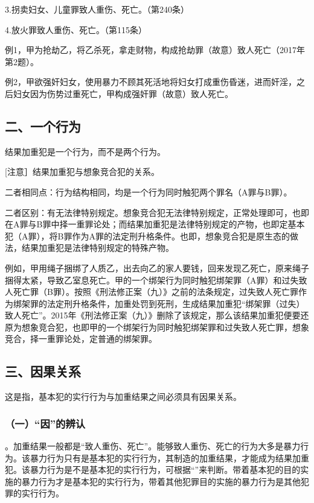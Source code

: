 3.拐卖妇女、儿童罪致人重伤、死亡。（第240条）

4.放火罪致人重伤、死亡。（第115条）

例1，甲为抢劫乙，将乙杀死，拿走财物，构成抢劫罪（故意）致人死亡（2017年第2题）。

例2，甲欲强奸妇女，使用暴力不顾其死活地将妇女打成重伤昏迷，进而奸淫，之后妇女因为伤势过重死亡，甲构成强奸罪（故意）致人死亡。

\subsection*{二、一个行为}

结果加重犯是一个行为，而不是两个行为。

[注意］结果加重犯与想象竞合犯的关系。

二者相同点：行为结构相同，均是一个行为同时触犯两个罪名（A罪与B罪）。

二者区别：有无法律特别规定。想象竞合犯无法律特别规定，正常处理即可，也即在A罪与B罪中择一重罪论处；而结果加重犯是法律特别规定的产物，也即定基本犯（A罪），将B罪作为A罪的法定刑升格条件。也即，想象竞合犯是原生态的做法，结果加重犯是法律特别规定的特殊产物。

例如，甲用绳子捆绑了人质乙，出去向乙的家人要钱，回来发现乙死亡，原来绳子捆得太紧，导致乙室息死亡。甲的一个绑架行为同时触犯绑架罪（A罪）和过失致人死亡罪（B罪）。按照《刑法修正案（九）》之前的法条规定，过失致人死亡罪作为绑架罪的法定刑升格条件，加重处罚到死刑，生成结果加重犯“绑架罪（过失）致人死亡”。2015年《刑法修正案（九）》删除了该规定，那么该结果加重犯便要还原为想象竞合犯，也即甲的一个绑架行为同时触犯绑架罪和过失致人死亡罪，想象竞合，择一重罪论处，定普通的绑架罪。


\subsection*{三、因果关系}

这是指，基本犯的实行行为与加重结果之间必须具有因果关系。

\subsubsection*{（一）“因”的辨认}

。加重结果一般都是“致人重伤、死亡”。能够致人重伤、死亡的行为大多是暴力行为。该暴力行为只有是基本犯的实行行为，其制造的加重结果，才能成为结果加重犯。该暴力行为是不是基本犯的实行行为，可根据“”来判断。带着基本犯的目的实施的暴力行为才是基本犯的实行行为，带着其他犯罪目的实施的暴力行为是其他犯罪的实行行为。

